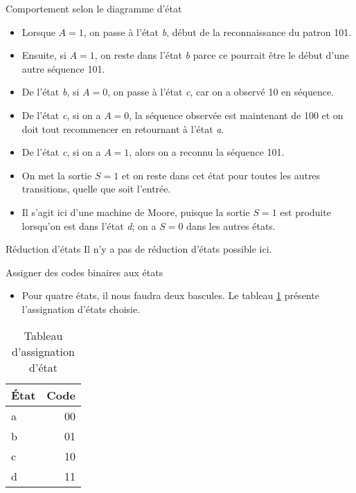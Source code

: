 \documentclass[presentation]{beamer}
\begin{document}
\begin{frame}[label={sec:orgb07d4e4}]{Comportement selon le diagramme d'état}
\begin{itemize}
\item Lorsque \(A=1\), on passe à l'état \emph{b}, début de la reconnaissance du patron 101.

\item Ensuite, si \(A=1\), on reste dans l'état \emph{b} parce ce pourrait être le début d'une autre séquence 101.

\item De l'état \emph{b}, si \(A=0\), on passe à l'état \emph{c}, car on a observé 10 en séquence.

\item De l'état \emph{c}, si on a \(A=0\), la séquence observée est maintenant de 100 et on doit tout recommencer en retournant à l'état \emph{a}.

\item De l'état \emph{c}, si on a \(A=1\), alors on a reconnu la séquence 101.

\item On met la sortie \(S=1\) et on reste dans cet état pour toutes les autres transitions, quelle que soit l'entrée.

\item Il s'agit ici d'une machine de Moore, puisque la sortie  \(S=1\) est produite lorsqu'on est dans l'état \emph{d}; on a \(S=0\) dans les autres états.
\end{itemize}
\end{frame}


\begin{frame}[label={sec:orgd68ba6b}]{Réduction d'états}
Il n'y a pas de réduction d'états possible ici.
\end{frame}

\begin{frame}[label={sec:org413d97f}]{Assigner des codes binaires aux états}
\begin{itemize}
\item Pour quatre états, il nous faudra deux bascules.  Le tableau \ref{tab:org745652e} présente l'assignation d'états choisie.
\end{itemize}

\begin{table}[htbp]
\caption{\label{tab:org745652e}Tableau d'assignation d'état}
\centering
\begin{tabular}{lr}
État & Code\\[0pt]
\hline
a & 00\\[0pt]
b & 01\\[0pt]
c & 10\\[0pt]
d & 11\\[0pt]
\end{tabular}
\end{table}
\end{frame}
\end{document}
